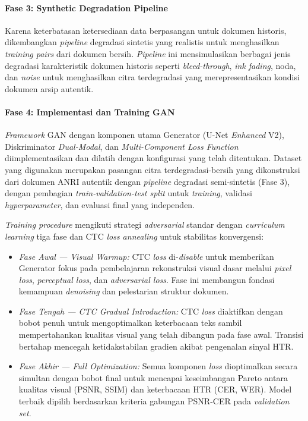 \documentclass[12pt,a4paper]{article}
\begin{document}
\paragraph{Fase 3: Synthetic Degradation Pipeline}
Karena keterbatasan ketersediaan data berpasangan untuk dokumen historis, dikembangkan \textit{pipeline} degradasi sintetis yang realistis untuk menghasilkan \textit{training pairs} dari dokumen bersih. \textit{Pipeline} ini mensimulasikan berbagai jenis degradasi karakteristik dokumen historis seperti \textit{bleed-through}, \textit{ink fading}, noda, dan \textit{noise} untuk menghasilkan citra terdegradasi yang merepresentasikan kondisi dokumen arsip autentik.

\paragraph{Fase 4: Implementasi dan Training GAN}
\textit{Framework} GAN dengan komponen utama Generator (U-Net \textit{Enhanced} V2), Diskriminator \textit{Dual-Modal}, dan \textit{Multi-Component Loss Function} diimplementasikan dan dilatih dengan konfigurasi yang telah ditentukan. Dataset yang digunakan merupakan pasangan citra terdegradasi-bersih yang dikonstruksi dari dokumen ANRI autentik dengan \textit{pipeline} degradasi semi-sintetis (Fase 3), dengan pembagian \textit{train-validation-test split} untuk \textit{training}, validasi \textit{hyperparameter}, dan evaluasi final yang independen.

\textit{Training procedure} mengikuti strategi \textit{adversarial} standar dengan \textit{curriculum learning} tiga fase dan CTC \textit{loss annealing} untuk stabilitas konvergensi:

\begin{itemize}[leftmargin=1.5cm, nosep]
\item \textit{Fase Awal --- Visual Warmup:} CTC \textit{loss} di-\textit{disable} untuk memberikan Generator fokus pada pembelajaran rekonstruksi visual dasar melalui \textit{pixel loss}, \textit{perceptual loss}, dan \textit{adversarial loss}. Fase ini membangun fondasi kemampuan \textit{denoising} dan pelestarian struktur dokumen.

\item \textit{Fase Tengah --- CTC \textit{Gradual Introduction}:} CTC \textit{loss} diaktifkan dengan bobot penuh untuk mengoptimalkan keterbacaan teks sambil mempertahankan kualitas visual yang telah dibangun pada fase awal. Transisi bertahap mencegah ketidakstabilan gradien akibat pengenalan sinyal HTR.

\item \textit{Fase Akhir --- \textit{Full Optimization}:} Semua komponen \textit{loss} dioptimalkan secara simultan dengan bobot final untuk mencapai keseimbangan Pareto antara kualitas visual (PSNR, SSIM) dan keterbacaan HTR (CER, WER). Model terbaik dipilih berdasarkan kriteria gabungan PSNR-CER pada \textit{validation set}.
\end{itemize}
\end{document}
